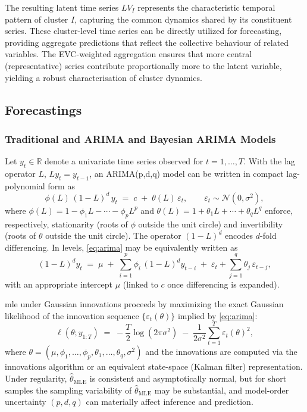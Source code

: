 \documentclass[preprint, 3p,
authoryear]{elsarticle} %
\begin{document}
The resulting latent time series \(LV_I\) represents the characteristic
temporal pattern of cluster \(I\), capturing the common dynamics shared
by its constituent series. These cluster-level time series can be
directly utilized for forecasting, providing aggregate predictions that
reflect the collective behaviour of related variables. The EVC-weighted
aggregation ensures that more central (representative) series contribute
proportionally more to the latent variable, yielding a robust
characterisation of cluster dynamics.

\subsection{Forecastings}\label{sec:forecast}

\subsubsection{Traditional and ARIMA and Bayesian ARIMA
Models}\label{sec:arima}

Let \(y_t \in \mathbb{R}\) denote a univariate time series observed for
\(t = 1,\ldots,T\). With the lag operator \(L\), \(L y_t = y_{t-1}\), an
ARIMA(p,d,q) model can be written in compact lag-polynomial form as
\begin{equation}
\phi(L)\,(1-L)^d\,y_t \;=\; c \;+\; \theta(L)\,\varepsilon_t,
\qquad
\varepsilon_t \sim \mathcal{N}(0,\sigma^2),
\label{eq:arima}
\end{equation} where \(\phi(L)=1-\phi_1 L-\cdots-\phi_p L^p\) and
\(\theta(L)=1+\theta_1 L+\cdots+\theta_q L^q\) enforce, respectively,
stationarity (roots of \(\phi\) outside the unit circle) and
invertibility (roots of \(\theta\) outside the unit circle). The
operator \((1-L)^d\) encodes \(d\)-fold differencing. In levels,
\eqref{eq:arima} may be equivalently written as \begin{equation}
(1-L)^d y_t \;=\; \mu \;+\; \sum_{i=1}^p \phi_i\, (1-L)^d y_{t-i} \;+\; \varepsilon_t + \sum_{j=1}^q \theta_j\,\varepsilon_{t-j},
\label{eq:arima_levels}
\end{equation} with an appropriate intercept \(\mu\) (linked to \(c\)
once differencing is expanded).

\gls{mle} under Gaussian innovations proceeds by maximizing the exact
Gaussian likelihood of the innovation sequence
\(\{\varepsilon_t(\theta)\}\) implied by \eqref{eq:arima}:
\begin{equation}
\ell(\theta; y_{1:T}) \;=\; -\frac{T}{2}\log(2\pi\sigma^2) \;-\; \frac{1}{2\sigma^2}\sum_{t=1}^T \varepsilon_t(\theta)^2,
\label{eq:lik}
\end{equation} where
\(\theta=(\mu,\phi_1,\dots,\phi_p,\theta_1,\dots,\theta_q,\sigma^2)\)
and the innovations are computed via the innovations algorithm or an
equivalent state-space (Kalman filter) representation. Under regularity,
\(\widehat{\theta}_{\text{MLE}}\) is consistent and asymptotically
normal, but for short samples the sampling variability of
\(\widehat{\theta}_{\text{MLE}}\) may be substantial, and model-order
uncertainty \((p,d,q)\) can materially affect inference and prediction.
\end{document}
